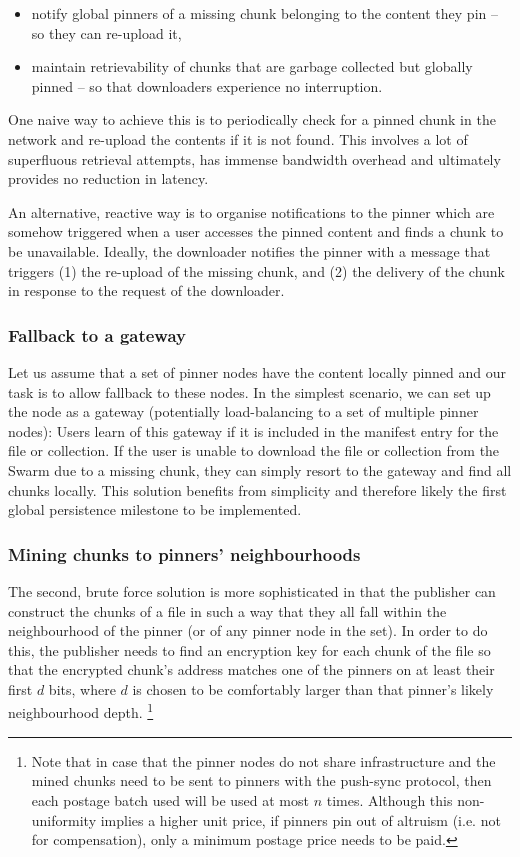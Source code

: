 \begin{itemize}
    \item  notify global pinners of a missing chunk belonging to the content they pin -- so they can re-upload it,
    \item  maintain retrievability of chunks that are garbage collected but globally pinned -- so that downloaders experience no interruption. 
\end{itemize}

One naive way to achieve this is to periodically check for a pinned chunk in the network and re-upload the contents if it is not found. This involves a lot of superfluous retrieval attempts, has immense bandwidth overhead and ultimately provides no reduction in latency.

An alternative, reactive way is to organise notifications to the pinner which are somehow triggered when a user accesses the pinned content and finds a chunk to be unavailable. Ideally, the downloader notifies the pinner with a message that triggers (1) the re-upload of the missing chunk, and (2) the delivery of the chunk in response to the request of the downloader.  

\subsubsection{Fallback to a gateway}

Let us assume that a set of pinner nodes have the content locally pinned and our task is to allow fallback to these nodes. In the simplest scenario, we can set up the node as a gateway (potentially load-balancing to a set of multiple pinner nodes): Users learn of this gateway if it is included in the manifest entry for the file or collection. If the user is unable to download the file or collection from the Swarm due to a missing chunk, they can simply resort to the gateway and find all chunks locally.
This solution benefits from simplicity and therefore likely the first global persistence milestone to be implemented.  

\subsubsection{Mining chunks to pinners' neighbourhoods}

The second, brute force solution is more sophisticated in that the publisher can construct the chunks of a file in such a way that they all fall within the neighbourhood of the pinner (or of any pinner node in the set). In order to do this, the publisher needs to find an encryption key for each chunk of the file so that the encrypted chunk's address matches one of the pinners on at least their first $d$ bits, where $d$ is chosen to be comfortably larger than that pinner's likely neighbourhood depth.%
%
\footnote{Note that in case that the pinner nodes do not share infrastructure and the mined chunks need to be sent to pinners with the push-sync protocol, then each postage batch used will be used at most $n$ times. Although this non-uniformity implies a higher unit price, if pinners pin out of altruism (i.e. not for compensation), only a minimum postage price needs to be paid.
}

